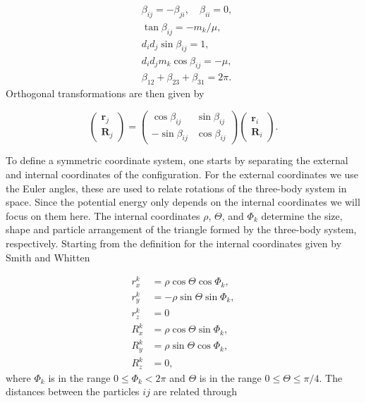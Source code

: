 \begin{subequations}
	\begin{align}
	&\beta_{ij} = -\beta_{ji}, \quad \beta_{ii} = 0,\\
	&\tan\beta_{ij} = -m_k/\mu,\\
	&d_{i}d_{j} \sin\beta_{ij} = 1,\\
	&d_{i}d_{j} m_{k} \cos\beta_{ij} = -\mu,\\
	&\beta_{12}+\beta_{23}+\beta_{31} = 2\pi.
	\end{align}
\end{subequations}
Orthogonal transformations are then given by 

\begin{equation}\label{eq:kinematic_rot}
\begin{pmatrix}
\mathbf{r}_j\\
\mathbf{R}_j
\end{pmatrix}
=
\begin{pmatrix}
\cos\beta_{ij} & \sin\beta_{ij}\\
-\sin\beta_{ij} & \cos\beta_{ij}
\end{pmatrix}
\begin{pmatrix}
\mathbf{r}_i\\
\mathbf{R}_i
\end{pmatrix}.
\end{equation}   

To define a symmetric coordinate system, one starts by separating the external and internal coordinates of the configuration. For the external coordinates we use the Euler angles, these are used to relate rotations of the three-body system in space. Since the potential energy only depends on the internal coordinates we will focus on them here. The internal coordinates $\rho$, $\Theta$, and $\Phi_k$ determine the size, shape and particle arrangement of the triangle formed by the three-body system, respectively. Starting from the definition for the internal coordinates given by Smith and Whitten \cite{Smith_Whitten1968}

\begin{equation}
	\begin{aligned}
	r_x^k &= \rho \cos\Theta\cos\Phi_k,\\
	r_y^k &= -\rho \sin\Theta\sin\Phi_k,\\
	r_z^k &= 0\\
	R_x^k &= \rho \cos\Theta\sin\Phi_k,\\
	R_y^k &= \rho \sin\Theta\cos\Phi_k,\\
	R_z^k &= 0,
	\end{aligned}   
\end{equation}
where $\Phi_k$ is in the range $0 \leq \Phi_k < 2\pi$ and $\Theta$ is in the range $0 \leq \Theta \leq \pi/4$. The distances between the particles $ij$ are related through 

